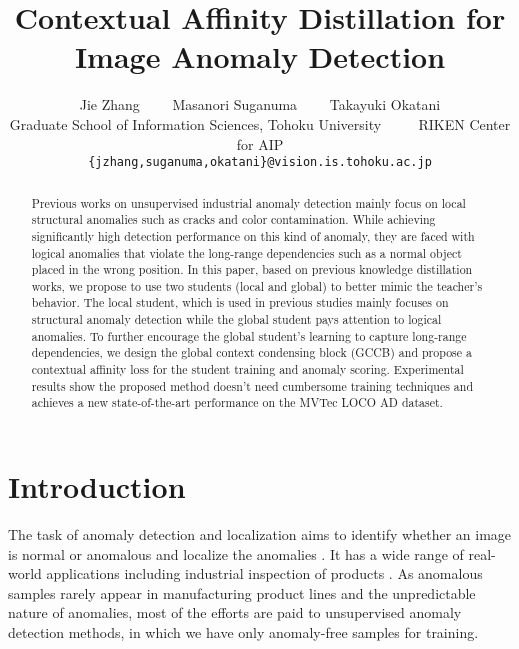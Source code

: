 \documentclass[10pt,twocolumn,letterpaper]{article}
\begin{document}
\title{Contextual Affinity Distillation for Image Anomaly Detection}

\author{Jie Zhang
~~~~Masanori Suganuma
~~~~Takayuki Okatani\\
Graduate School of Information Sciences, Tohoku University ~~~~ RIKEN Center for AIP \\
{\tt\small \{jzhang,suganuma,okatani\}@vision.is.tohoku.ac.jp}
}

\maketitle
\ificcvfinal\thispagestyle{empty}\fi


\begin{abstract}
Previous works on unsupervised industrial anomaly detection mainly focus on local structural anomalies such as cracks and color contamination. While achieving significantly high detection performance on this kind of anomaly, they are faced with logical anomalies that violate the long-range dependencies such as a normal object placed in the wrong position. In this paper, based on previous knowledge distillation works, we propose to use two students (local and global) to better mimic the teacher's behavior. The local student, which is used in previous studies mainly focuses on structural anomaly detection while the global student pays attention to logical anomalies. To further encourage the global student's learning to capture long-range dependencies, we design the global context condensing block (GCCB) and propose a contextual affinity loss for the student training and anomaly scoring. Experimental results show the proposed method doesn't need cumbersome training techniques and achieves a new state-of-the-art performance on the MVTec LOCO AD dataset.
\end{abstract}

\section{Introduction}
\label{sec:intro}
The task of anomaly detection and localization aims to identify whether an image is normal or anomalous and localize the anomalies \cite{chalapathy2019deep,ruff2021unifying}. It has a wide range of real-world applications including industrial inspection of products \cite{bergmann2019mvtec,bergmann2018improving}. As anomalous samples rarely appear in manufacturing product lines and the unpredictable nature of anomalies, most of the efforts are paid to unsupervised anomaly detection methods, in which we have only anomaly-free samples for training.
\end{document}
